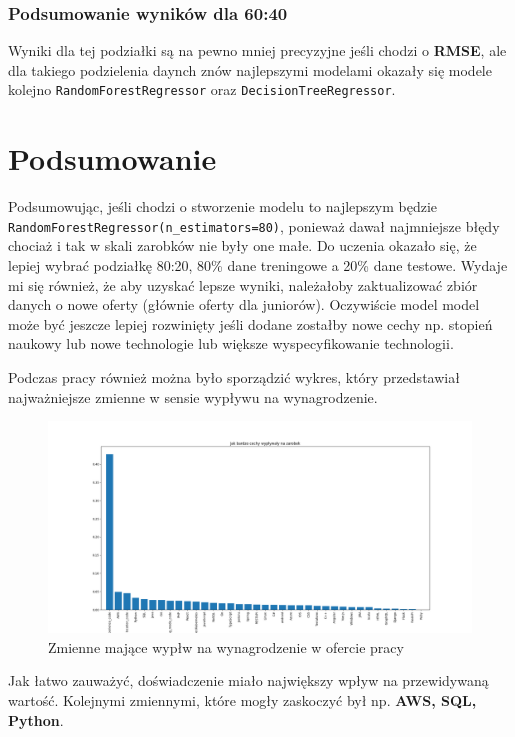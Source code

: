 \documentclass[a4paper]{article}
\begin{document}
\subsubsection{Podsumowanie wyników dla 60:40}


\quad Wyniki dla tej podziałki są na pewno mniej precyzyjne jeśli chodzi o \textbf{RMSE}, ale dla takiego podzielenia daynch znów najlepszymi modelami okazały się modele
kolejno \texttt{RandomForestRegressor} oraz \texttt{DecisionTreeRegressor}.

\section{Podsumowanie}
\quad Podsumowując, jeśli chodzi o stworzenie modelu to najlepszym będzie \newline \texttt{RandomForestRegressor(n\_estimators=80)},
ponieważ dawał najmniejsze błędy chociaż i tak w skali zarobków nie były one małe.
Do uczenia okazało się, że lepiej wybrać podziałkę 80:20, 80\% dane treningowe a 20\% dane testowe. Wydaje mi się również, że aby uzyskać lepsze wyniki,
należałoby zaktualizować zbiór danych o nowe oferty (głównie oferty dla juniorów).
Oczywiście model model może być jeszcze lepiej rozwinięty jeśli dodane zostałby nowe cechy np. stopień naukowy lub nowe
technologie lub większe wyspecyfikowanie technologii.

\quad Podczas pracy również można było sporządzić wykres, który przedstawiał najważniejsze zmienne w sensie wypływu na wynagrodzenie.

\begin{figure}[H]
    \centering
    \includegraphics[width=\textwidth]{../analysis/plots/wyniki/importance_of_vars.png}
    \caption{Zmienne mające wypłw na wynagrodzenie w ofercie pracy}
\end{figure}

\quad Jak łatwo zauważyć, doświadczenie miało największy wpływ na przewidywaną wartość.
Kolejnymi zmiennymi, które mogły zaskoczyć był np. \textbf{AWS, SQL, Python}.
\end{document}
